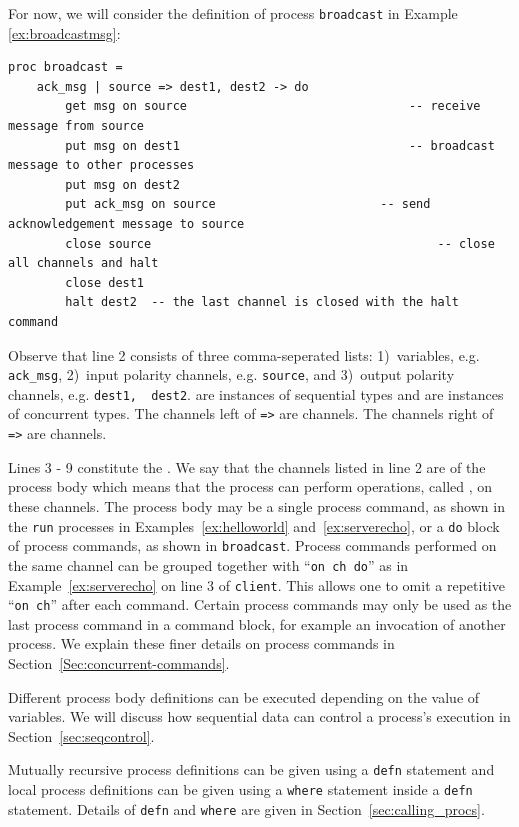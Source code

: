 \documentclass[11pt]{article}
\begin{document}
For now, we will consider the definition of process \lstinline$broadcast$ in Example \ref{ex:broadcastmsg}:
\begin{lstlisting}[label=ex:broadcastmsg, caption=Process that broadcasts a message from a single source] 
proc broadcast = 
	ack_msg | source => dest1, dest2 -> do
		get msg on source								-- receive message from source
		put msg on dest1								-- broadcast message to other processes
		put msg on dest2
		put ack_msg on source						-- send acknowledgement message to source
		close source										-- close all channels and halt
		close dest1
		halt dest2  -- the last channel is closed with the halt command
\end{lstlisting}
Observe that line 2 consists of three comma-seperated lists: 1)~variables, e.g. \lstinline$ack_msg$, 2)~input polarity channels, e.g. \lstinline$source$, and 3)~output polarity channels, e.g. \lstinline$dest1,  dest2$.
 are instances of sequential types and  are instances of concurrent types.
The channels left of \lstinline$=>$ are  channels.
The channels right of \lstinline$=>$ are  channels.

Lines 3 - 9 constitute the .
We say that the channels listed in line 2 are  of the process body which means that the process can perform operations, called , on these channels.
The process body may be a single process command, as shown in the \lstinline$run$ processes in Examples~\ref{ex:helloworld} and~\ref{ex:serverecho}, or a \lstinline$do$ block of process commands, as shown in \lstinline$broadcast$.
Process commands performed on the same channel can be grouped together with ``\lstinline$on ch do$'' as in Example~\ref{ex:serverecho} on line 3 of \lstinline$client$.
This allows one to omit a repetitive ``\lstinline$on ch$'' after each command.
Certain process commands may only be used as the last process command in a command block, for example an invocation of another process. 
We explain these finer details on process commands in Section~\ref{Sec:concurrent-commands}.

Different process body definitions can be executed depending on the value of variables.
We will discuss how sequential data can control a process's execution in Section~\ref{sec:seqcontrol}.

Mutually recursive process definitions can be given using a \lstinline$defn$ statement and local process definitions can be given using a \lstinline$where$ statement inside a \lstinline$defn$ statement. 
Details of \lstinline$defn$ and \lstinline$where$ are given in Section~\ref{sec:calling_procs}.
\end{document}
